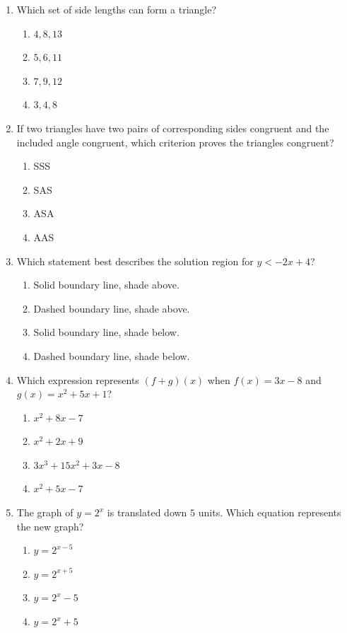 \documentclass[11pt]{article}
\begin{document}
\begin{enumerate}
\item Which set of side lengths can form a triangle?
\begin{enumerate}[label=(\Alph*)]
\item $4,8,13$ \item $5,6,11$ \item $7,9,12$ \item $3,4,8$
\end{enumerate}

\item If two triangles have two pairs of corresponding sides congruent and the included angle congruent, which criterion proves the triangles congruent?
\begin{enumerate}[label=(\Alph*)]
\item SSS \item SAS \item ASA \item AAS
\end{enumerate}

\item Which statement best describes the solution region for $y< -2x+4$?
\begin{enumerate}[label=(\Alph*)]
\item Solid boundary line, shade above.
\item Dashed boundary line, shade above.
\item Solid boundary line, shade below.
\item Dashed boundary line, shade below.
\end{enumerate}

\item Which expression represents $(f+g)(x)$ when $f(x)=3x-8$ and $g(x)=x^2+5x+1$?
\begin{enumerate}[label=(\Alph*)]
\item $x^2+8x-7$ \item $x^2+2x+9$ \item $3x^3+15x^2+3x-8$ \item $x^2+5x-7$
\end{enumerate}

\item The graph of $y=2^x$ is translated down $5$ units. Which equation represents the new graph?
\begin{enumerate}[label=(\Alph*)]
\item $y=2^{x-5}$ \item $y=2^{x+5}$ \item $y=2^x-5$ \item $y=2^x+5$
\end{enumerate}


\end{enumerate}
\end{document}
